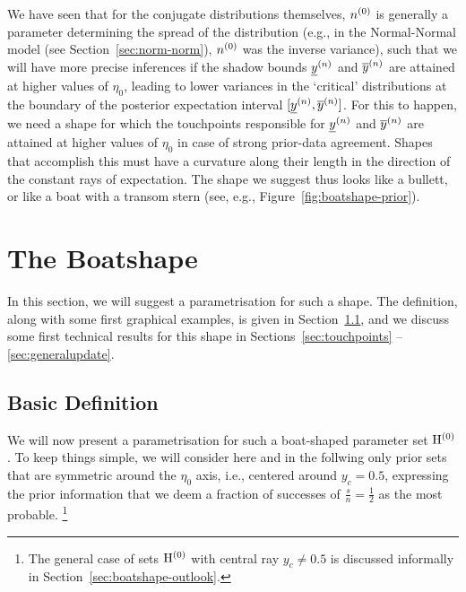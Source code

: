 We have seen that for the conjugate distributions themselves,
$n^{(0)}$ is generally a parameter determining the spread of the distribution
(e.g., in the Normal-Normal model (see Section~\ref{sec:norm-norm}), $n^{(0)}$ was the inverse variance),
such that we will have more precise inferences if the shadow bounds $\underline{y}^{(n)}$ and $\overline{y}^{(n)}$
are attained at higher values of $\eta_0$, leading to lower variances in the
`critical' distributions at the boundary of the posterior expectation interval $[\underline{y}^{(n)},\overline{y}^{(n)}]$.
For this to happen, we need a shape for which the touchpoints responsible for $\underline{y}^{(n)}$ and $\overline{y}^{(n)}$
are attained at higher values of $\eta_0$ in case of strong prior-data agreement.
Shapes that accomplish this must have a curvature along their length in the direction
of the constant rays of expectation.
The shape we suggest thus looks like a bullett, or like a boat with a transom stern
(see, e.g., Figure~\ref{fig:boatshape-prior}).

\section{The Boatshape}
\label{sec:boatshape-2}

In this section, %
we will suggest a parametrisation for such a shape.
The definition, along with some first graphical examples, is given in Section~\ref{sec:basicdefboat},
and we discuss some first technical results for this shape in Sections~\ref{sec:touchpoints} -- \ref{sec:generalupdate}.


\subsection{Basic Definition}
\label{sec:basicdefboat}

We will now present a parametrisation for such a boat-shaped parameter set $\mathrm{H}^{(0)}$.
To keep things simple, we will consider here and in the follwing only prior sets
that are symmetric around the $\eta_0$ axis, i.e., centered around $y_c = 0.5$,
expressing the prior information that we deem a fraction of successes of $\frac{s}{n} = \frac{1}{2}$
as the most probable.%
\footnote{The general case of sets $\mathrm{H}^{(0)}$ with central ray $y_c \neq 0.5$
is discussed informally in Section~\ref{sec:boatshape-outlook}.}

